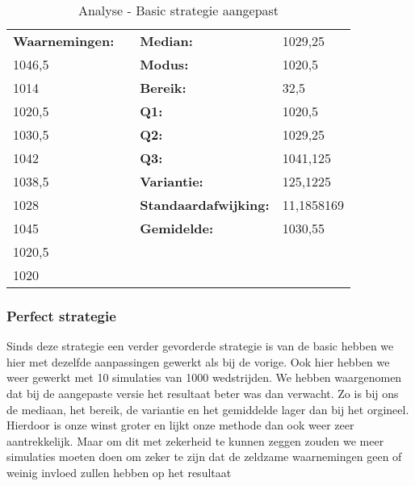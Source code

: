 \documentclass[conference]{IEEEtran}
\begin{document}
\begin{table}[htbp] \caption{Analyse - Basic strategie aangepast}
 \tiny
 \centering
 \begin{tabular}{|l|lll} \cline{1-1} \cline{3-4} \textbf{Waarnemingen:} & \multicolumn{1}{l|}{} & \multicolumn{1}{l|}{\textbf{Median:}} & \multicolumn{1}{l|}{1029,25} \\ \cline{1-1} \cline{3-4}  1046,5 & \multicolumn{1}{l|}{} & \multicolumn{1}{l|}{\textbf{Modus:}} & \multicolumn{1}{l|}{1020,5} \\ \cline{1-1} \cline{3-4}  1014 & \multicolumn{1}{l|}{} & \multicolumn{1}{l|}{\textbf{Bereik:}} & \multicolumn{1}{l|}{32,5} \\ \cline{1-1} \cline{3-4}  1020,5 & \multicolumn{1}{l|}{} & \multicolumn{1}{l|}{\textbf{Q1:}} & \multicolumn{1}{l|}{1020,5} \\ \cline{1-1} \cline{3-4}  1030,5 & \multicolumn{1}{l|}{} & \multicolumn{1}{l|}{\textbf{Q2:}} & \multicolumn{1}{l|}{1029,25} \\ \cline{1-1} \cline{3-4}  1042 & \multicolumn{1}{l|}{} & \multicolumn{1}{l|}{\textbf{Q3:}} & \multicolumn{1}{l|}{1041,125} \\ \cline{1-1} \cline{3-4}  1038,5 & \multicolumn{1}{l|}{} & \multicolumn{1}{l|}{\textbf{Variantie:}} & \multicolumn{1}{l|}{125,1225} \\ \cline{1-1} \cline{3-4}  1028 & \multicolumn{1}{l|}{} & \multicolumn{1}{l|}{\textbf{Standaardafwijking:}} & \multicolumn{1}{l|}{11,1858169} \\ \cline{1-1} \cline{3-4}  1045 & \multicolumn{1}{l|}{} & \multicolumn{1}{l|}{\textbf{Gemidelde:}} & \multicolumn{1}{l|}{1030,55} \\ \cline{1-1} \cline{3-4}  1020,5 &  &  &  \\ \cline{1-1} 1020 &  & \textbf{} &  \\ \cline{1-1} 
\end{tabular}
\end{table}
\subsubsection{Perfect strategie}
Sinds deze strategie een verder gevorderde strategie is van de basic hebben we hier met dezelfde aanpassingen gewerkt als bij de vorige. Ook hier hebben we weer gewerkt met 10 simulaties van 1000 wedstrijden. We hebben waargenomen dat bij de aangepaste versie het resultaat beter was dan verwacht. Zo is bij ons de mediaan, het bereik, de variantie en het gemiddelde lager dan bij het orgineel. Hierdoor is onze winst groter en lijkt onze methode dan ook weer zeer aantrekkelijk. Maar om dit met zekerheid te kunnen zeggen zouden we meer simulaties moeten doen om zeker te zijn dat de zeldzame waarnemingen geen of weinig invloed zullen hebben op het resultaat
\end{document}
